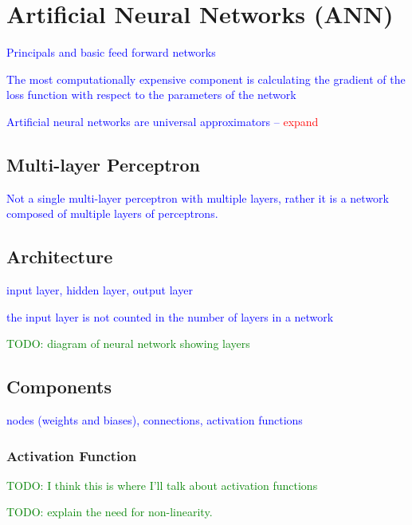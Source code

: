 \section{Artificial Neural Networks (ANN)}

\textcolor{blue}{Principals and basic feed forward networks}

\textcolor{blue}{The most computationally expensive component is calculating the gradient of the loss function with respect to the parameters of the network}

\textcolor{blue}{Artificial neural networks are {universal approximators} -- \textcolor{red}{expand}}

\subsection{Multi-layer Perceptron}

\textcolor{blue}{Not a single multi-layer perceptron with multiple layers, rather it is a network composed of multiple layers of perceptrons.}

\subsection{Architecture}

\textcolor{blue}{{input layer}, {hidden layer}, {output layer}}

\textcolor{blue}{the input layer is not counted in the number of layers in a network}

\textcolor{green}{TODO: diagram of neural network showing layers}

\subsection{Components}

\textcolor{blue}{nodes (weights and biases), connections, activation functions}

\subsubsection{Activation Function}

\textcolor{green}{TODO: I think this is where I'll talk about activation functions}

\textcolor{green}{TODO: explain the need for non-linearity.}

